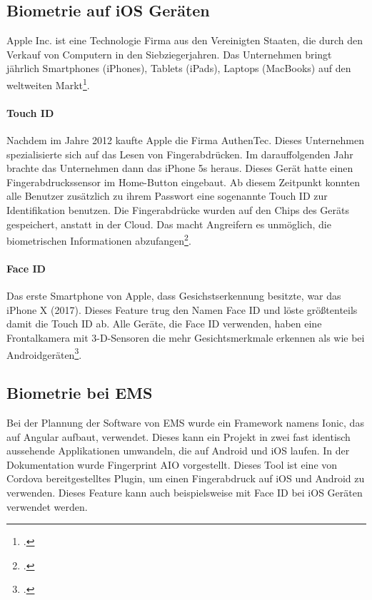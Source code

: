 \subsection{Biometrie auf iOS Geräten}
Apple Inc. ist eine Technologie Firma aus den Vereinigten Staaten, die durch den Verkauf von Computern in den Siebziegerjahren. Das Unternehmen bringt jährlich Smartphones (iPhones), Tablets (iPads), Laptops (MacBooks) auf den weltweiten Markt\footcite{apple}.
\paragraph{Touch ID}
Nachdem im Jahre 2012 kaufte Apple die Firma AuthenTec. Dieses Unternehmen spezialisierte sich auf das Lesen von Fingerabdrücken.
Im darauffolgenden Jahr brachte das Unternehmen dann das iPhone 5s heraus. Dieses Gerät hatte einen Fingerabdruckssensor im Home-Button eingebaut. Ab diesem Zeitpunkt konnten alle Benutzer zusätzlich zu ihrem Passwort eine sogenannte Touch ID zur Identifikation benutzen.
Die Fingerabdrücke wurden auf den Chips des Geräts gespeichert, anstatt in der Cloud. Das macht Angreifern es unmöglich, die biometrischen Informationen abzufangen\footcite{touchid}.

\paragraph{Face ID}
Das erste Smartphone von Apple, dass Gesichstserkennung besitzte, war das iPhone X (2017). Dieses Feature trug den Namen Face ID und löste größtenteils damit die Touch ID ab.
Alle Geräte, die Face ID verwenden, haben eine Frontalkamera mit 3-D-Sensoren die mehr Gesichtsmerkmale erkennen als wie bei Androidgeräten\footcite{faceid}.


\subsection{Biometrie bei EMS}
Bei der Plannung der Software von EMS wurde ein Framework namens Ionic, das auf Angular aufbaut, verwendet. Dieses kann ein Projekt in zwei fast identisch aussehende Applikationen umwandeln, die auf Android und iOS laufen.
In der Dokumentation wurde Fingerprint AIO vorgestellt. Dieses Tool ist eine von Cordova bereitgestelltes Plugin, um einen Fingerabdruck auf iOS und Android zu verwenden.
Dieses Feature kann auch beispielsweise mit Face ID bei iOS Geräten verwendet werden.


